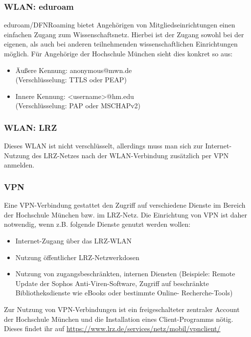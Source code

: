 \subsubsection{WLAN: eduroam}

eduroam/DFNRoaming bietet Angehörigen von Mitgliedseinrichtungen einen einfachen Zugang zum Wissenschaftsnetz. Hierbei ist der Zugang sowohl bei der eigenen, als auch bei anderen teilnehmenden wissenschaftlichen Einrichtungen möglich.\doublebreak
Für Angehörige der Hochschule München sieht dies konkret so aus:
\begin{itemize}
		 \item{Äußere Kennung: anonymous@mwn.de\\ (Verschlüsselung: TTLS oder PEAP)}
		 \item{Innere Kennung: \textless username\textgreater @hm.edu\\ (Verschlüsselung: PAP oder MSCHAPv2)}
\end{itemize}


\subsubsection{WLAN: LRZ}

Dieses WLAN ist nicht verschlüsselt, allerdings muss man sich zur Internet-Nutzung des LRZ-Netzes nach der WLAN-Verbindung zusätzlich per VPN anmelden.

\subsubsection{VPN}

Eine VPN-Verbindung gestattet den Zugriff auf verschiedene Dienste im Bereich der Hochschule München bzw. im LRZ-Netz. Die Einrichtung von VPN ist daher notwendig, wenn z.B. folgende Dienste genutzt werden wollen:

\begin{itemize}
	\item{Internet-Zugang über das LRZ-WLAN}
	\item{Nutzung öffentlicher LRZ-Netzwerkdosen}
	\item{Nutzung von zugangsbeschränkten, internen Diensten (Beispiele: Remote Update der Sophos Anti-Viren-Software, Zugriff auf beschränkte Bibliotheksdienste wie eBooks oder bestimmte Online- Recherche-Tools)}
\end{itemize}
Zur Nutzung von VPN-Verbindungen ist ein freigeschalteter zentraler Account der Hochschule München und die Installation eines Client-Programms nötig. Dieses findet ihr auf \url{https://www.lrz.de/services/netz/mobil/vpnclient/}


